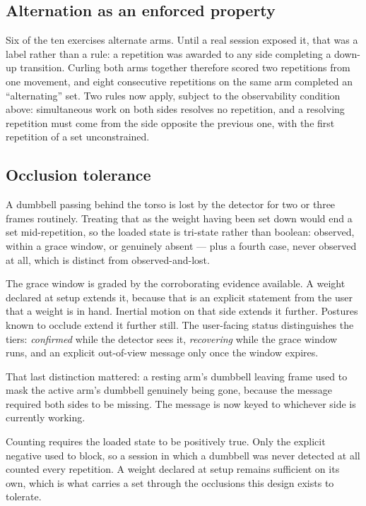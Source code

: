 \documentclass[11pt,a4paper]{article}
\begin{document}
\subsection{Alternation as an enforced property}

Six of the ten exercises alternate arms. Until a real session exposed it, that
was a label rather than a rule: a repetition was awarded to any side completing
a down-up transition. Curling both arms together therefore scored two
repetitions from one movement, and eight consecutive repetitions on the same arm
completed an ``alternating'' set. Two rules now apply, subject to the
observability condition above: simultaneous work on both sides resolves no
repetition, and a resolving repetition must come from the side opposite the
previous one, with the first repetition of a set unconstrained.

\subsection{Occlusion tolerance}

A dumbbell passing behind the torso is lost by the detector for two or three
frames routinely. Treating that as the weight having been set down would end a
set mid-repetition, so the loaded state is tri-state rather than boolean:
observed, within a grace window, or genuinely absent --- plus a fourth case,
never observed at all, which is distinct from observed-and-lost.

The grace window is graded by the corroborating evidence available. A weight
declared at setup extends it, because that is an explicit statement from the
user that a weight is in hand. Inertial motion on that side extends it further.
Postures known to occlude extend it further still. The user-facing status
distinguishes the tiers: \emph{confirmed} while the detector sees it,
\emph{recovering} while the grace window runs, and an explicit out-of-view
message only once the window expires.

That last distinction mattered: a resting arm's dumbbell leaving frame used to
mask the active arm's dumbbell genuinely being gone, because the message
required both sides to be missing. The message is now keyed to whichever side is
currently working.

Counting requires the loaded state to be positively true. Only the explicit
negative used to block, so a session in which a dumbbell was never detected at
all counted every repetition. A weight declared at setup remains sufficient on
its own, which is what carries a set through the occlusions this design exists
to tolerate.
\end{document}
